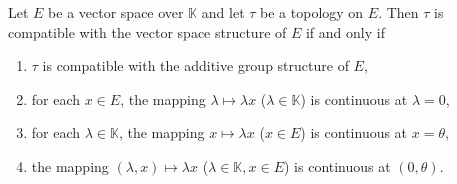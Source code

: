 Let $E$ be a vector space over $\mathbb{K}$ and let $\tau$ be a topology on $E$. Then $\tau$ is compatible with the vector space structure of $E$ if and only if
\begin{enumerate}
\item[(i)] $\tau$ is compatible with the additive group structure of $E$,
\item[(ii)] for each $x \in E$, the mapping $\lambda \mapsto \lambda x$ ($\lambda \in \mathbb{K}$) is continuous at $\lambda = 0$,
\item[(iii)] for each $\lambda \in \mathbb{K}$, the mapping $x \mapsto \lambda x$ ($x \in E$) is continuous at $x = \theta$,
\item[(iv)] the mapping $(\lambda, x) \mapsto \lambda x$ ($\lambda \in \mathbb{K}, x \in E$) is continuous at $(0, \theta)$.
\end{enumerate}

